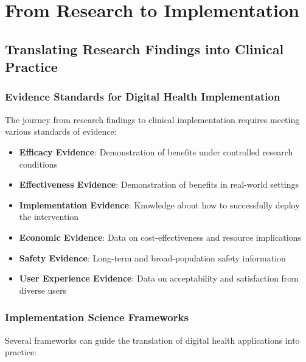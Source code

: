 \chapter{From Research to Implementation}

\section{Translating Research Findings into Clinical Practice}
\subsection{Evidence Standards for Digital Health Implementation}
The journey from research findings to clinical implementation requires meeting various standards of evidence:

\begin{itemize}
    \item \textbf{Efficacy Evidence}: Demonstration of benefits under controlled research conditions
    
    \item \textbf{Effectiveness Evidence}: Demonstration of benefits in real-world settings
    
    \item \textbf{Implementation Evidence}: Knowledge about how to successfully deploy the intervention
    
    \item \textbf{Economic Evidence}: Data on cost-effectiveness and resource implications
    
    \item \textbf{Safety Evidence}: Long-term and broad-population safety information
    
    \item \textbf{User Experience Evidence}: Data on acceptability and satisfaction from diverse users
\end{itemize}

\subsection{Implementation Science Frameworks}
Several frameworks can guide the translation of digital health applications into practice:

